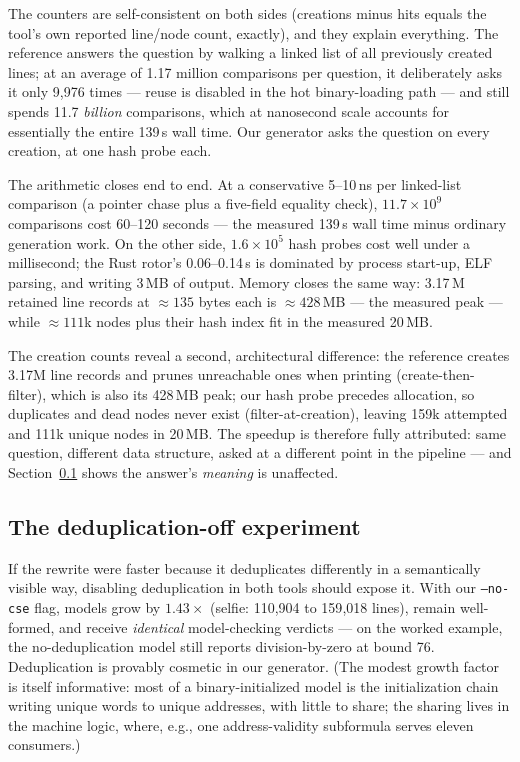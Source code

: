 \documentclass[sigplan,screen,nonacm]{acmart}
\begin{document}
The counters are self-consistent on both sides (creations minus hits
equals the tool's own reported line/node count, exactly), and they
explain everything. The reference answers the question by walking a
linked list of all previously created lines; at an average of 1.17
million comparisons per question, it deliberately asks it only 9{,}976
times --- reuse is disabled in the hot binary-loading path --- and still
spends 11.7 \emph{billion} comparisons, which at nanosecond scale
accounts for essentially the entire 139\,s wall time. Our generator
asks the question on every creation, at one hash probe each.

The arithmetic closes end to end. At a conservative 5--10\,ns per
linked-list comparison (a pointer chase plus a five-field equality
check), $11.7 \times 10^9$ comparisons cost 60--120 seconds --- the
measured 139\,s wall time minus ordinary generation work. On the other
side, $1.6 \times 10^5$ hash probes cost well under a millisecond; the
Rust rotor's 0.06--0.14\,s is dominated by process start-up, ELF
parsing, and writing 3\,MB of output. Memory closes the same way:
3.17\,M retained line records at ${\approx}135$ bytes each is
${\approx}428$\,MB --- the measured peak --- while ${\approx}111$k
nodes plus their hash index fit in the measured 20\,MB.

The creation counts reveal a second, architectural difference: the
reference creates 3.17M line records and prunes unreachable ones when
printing (create-then-filter), which is also its 428\,MB peak; our hash
probe precedes allocation, so duplicates and dead nodes never exist
(filter-at-creation), leaving 159k attempted and 111k unique nodes in
20\,MB. The speedup is therefore fully attributed: same question,
different data structure, asked at a different point in the pipeline ---
and Section~\ref{sec:cse} shows the answer's \emph{meaning} is
unaffected.

\subsection{The deduplication-off experiment}
\label{sec:cse}

If the rewrite were faster because it deduplicates differently in a
semantically visible way, disabling deduplication in both tools should
expose it. With our \texttt{--no-cse} flag, models grow by $1.43\times$
(selfie: 110{,}904 to 159{,}018 lines), remain well-formed, and receive
\emph{identical} model-checking verdicts --- on the worked example, the
no-deduplication model still reports division-by-zero at bound 76.
Deduplication is provably cosmetic in our generator. (The modest growth
factor is itself informative: most of a binary-initialized model is the
initialization chain writing unique words to unique addresses, with
little to share; the sharing lives in the machine logic, where, e.g.,
one address-validity subformula serves eleven consumers.)
\end{document}
